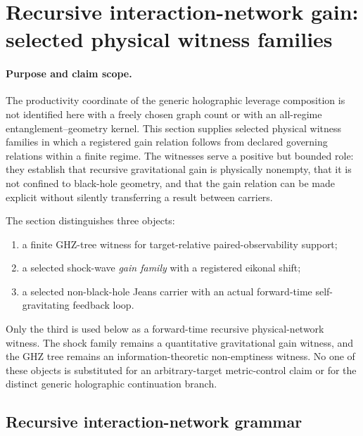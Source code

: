 \documentclass[11pt]{article}
\theoremstyle{definition}
\begin{document}
\section{Recursive interaction-network gain: selected physical witness families}
\label{supp:recursive-interaction-network-gain}

\paragraph{Purpose and claim scope.}
The productivity coordinate of the generic holographic leverage composition is
not identified here with a freely chosen graph count or with an all-regime
entanglement--geometry kernel.  This section supplies selected physical witness
families in which a registered gain relation follows from declared governing
relations within a finite regime.  The witnesses serve a positive but bounded
role: they establish that recursive gravitational gain is physically nonempty,
that it is not confined to black-hole geometry, and that the gain relation can
be made explicit without silently transferring a result between carriers.

The section distinguishes three objects:
\begin{enumerate}[label=(R\arabic*)]
\item a finite GHZ-tree witness for target-relative paired-observability support;
\item a selected shock-wave \emph{gain family} with a registered eikonal shift;
\item a selected non-black-hole Jeans carrier with an actual forward-time
      self-gravitating feedback loop.
\end{enumerate}
Only the third is used below as a forward-time recursive physical-network
witness.  The shock family remains a quantitative gravitational gain witness,
and the GHZ tree remains an information-theoretic non-emptiness witness.  No
one of these objects is substituted for an arbitrary-target metric-control
claim or for the distinct generic holographic continuation branch.

\subsection{Recursive interaction-network grammar}
\label{supp:recursive-network-definition}
\end{document}
